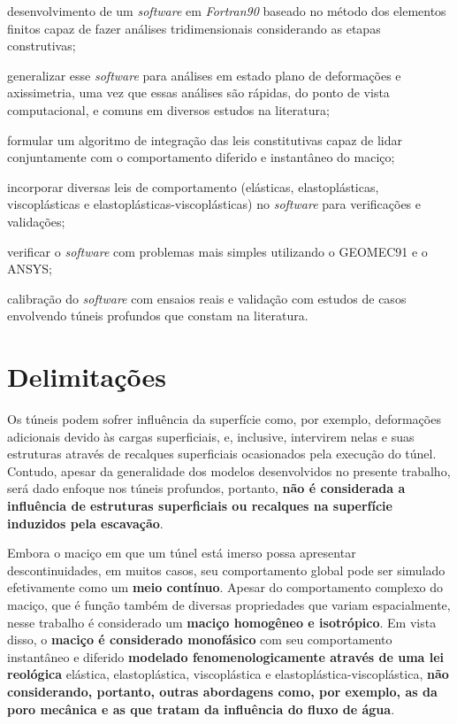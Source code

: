 \begin{alineas}
	
	\item desenvolvimento de um \textit{software} em \textit{Fortran90} baseado no método dos elementos finitos capaz de fazer análises tridimensionais considerando as etapas construtivas; 
	
	\item generalizar esse \textit{software} para análises em estado plano de deformações e axissimetria, uma vez que essas análises são rápidas, do ponto de vista computacional, e comuns em diversos estudos na literatura;
	
	\item formular um algoritmo de integração das leis constitutivas capaz de lidar conjuntamente com o comportamento diferido e instantâneo do maciço;
	
	\item incorporar diversas leis de comportamento (elásticas, elastoplásticas, viscoplásticas e elastoplásticas-viscoplásticas) no \textit{software} para verificações e validações;
	
	\item verificar o \textit{software} com problemas mais simples utilizando o GEOMEC91 e o ANSYS;
	
	\item calibração do \textit{software} com ensaios reais e validação com estudos de casos envolvendo túneis profundos que constam na literatura.
	
\end{alineas}

\section{Delimitações}
Os túneis podem sofrer influência da superfície como, por exemplo, deformações adicionais devido às cargas superficiais, e, inclusive, intervirem nelas e suas estruturas através de recalques superficiais ocasionados pela execução do túnel. Contudo, apesar da generalidade dos modelos desenvolvidos no presente trabalho, será dado enfoque nos túneis profundos, portanto, \textbf{não é considerada a influência de estruturas superficiais ou recalques na superfície induzidos pela escavação}.

Embora o maciço em que um túnel está imerso possa apresentar descontinuidades, em muitos casos, seu comportamento global pode ser simulado efetivamente como um \textbf{meio contínuo}. Apesar do comportamento complexo do maciço, que é função também de diversas propriedades que variam espacialmente, nesse trabalho é considerado um \textbf{maciço homogêneo e isotrópico}. Em vista disso, o \textbf{maciço é considerado monofásico} com seu comportamento instantâneo e diferido \textbf{modelado fenomenologicamente através de uma lei reológica} elástica, elastoplástica, viscoplástica e elastoplástica-viscoplástica, \textbf{não considerando, portanto, outras abordagens como, por exemplo, as da poro mecânica e as que tratam da influência do fluxo de água}.

